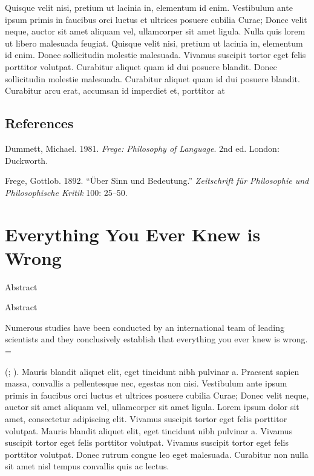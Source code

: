 \documentclass{scrbook}
\makeatletter
\def\@comingchapterauthor{} %
\def\@chapterauthor{} %
\newcommand{\chapterauthor}[1]{\def\@comingchapterauthor{#1}}
\newenvironment{abstract}{%
  \if@titlepage
    \titlepage
    \null\vfil
    \@beginparpenalty\@lowpenalty
    \if@abstrt
      \begin{center}
        \normalfont\sectfont\nobreak\abstractname
        \@endparpenalty\@M
      \end{center}
    \fi
  \else
    \if@twocolumn\if@abstrt
        \addsec*{\abstractname}
      \fi
    \else
      \if@abstrt
        \small
        \begin{center}
          {\normalfont\sectfont\nobreak\abstractname
            \vspace{-.5em}\vspace{\z@}}%
        \end{center}
      \fi
      \quotation
    \fi
  \fi
}{%
  \if@titlepage
    \par\vfil\null\endtitlepage
  \else
    \if@twocolumn\else\endquotation\fi
  \fi
}
\newcommand*\abstractname{Abstract}
\let\oldchapter\chapter
\renewcommand{\chapter}[2][]{%
   \clearpage%
   \let\@chapterauthor\@comingchapterauthor%
   \oldchapter[#1]{#2}%
}
\newlength{\cslhangindent}
\newlength{\cslentryspacingunit} %
\newenvironment{CSLReferences}[2] %
 {%
  \setlength{\parindent}{0pt}
  \ifodd #1
  \let\oldpar\par
  \def\par{\hangindent=\cslhangindent\oldpar}
  \fi
  \setlength{\parskip}{#2\cslentryspacingunit}
 }%
 {}
\makeatother
\begin{document}
Quisque velit nisi, pretium ut lacinia in, elementum id enim. Vestibulum
ante ipsum primis in faucibus orci luctus et ultrices posuere cubilia
Curae; Donec velit neque, auctor sit amet aliquam vel, ullamcorper sit
amet ligula. Nulla quis lorem ut libero malesuada feugiat. Quisque velit
nisi, pretium ut lacinia in, elementum id enim. Donec sollicitudin
molestie malesuada. Vivamus suscipit tortor eget felis porttitor
volutpat. Curabitur aliquet quam id dui posuere blandit. Donec
sollicitudin molestie malesuada. Curabitur aliquet quam id dui posuere
blandit. Curabitur arcu erat, accumsan id imperdiet et, porttitor at

\section*{References}\label{c2-c2-references}

\label{c2-refs}
\begin{CSLReferences}{1}{0}
Dummett, Michael. 1981. \emph{Frege: Philosophy of Language}. 2nd ed.
{London}: {Duckworth}.

Frege, Gottlob. 1892. {``Über Sinn und Bedeutung.''} \emph{Zeitschrift
für Philosophie und Philosophische Kritik} 100: 25--50.

\end{CSLReferences}

\chapterauthor{Al Coholic and Seymour Butt}
\chapter[Everything is Wrong]{Everything You Ever Knew is Wrong}


\begin{abstract}
Numerous studies have been conducted by an international team of leading
scientists and they conclusively establish that everything you ever knew
is wrong.
\end{abstract}
%
%
(;
). Mauris blandit
aliquet elit, eget tincidunt nibh pulvinar a. Praesent sapien massa,
convallis a pellentesque nec, egestas non nisi. Vestibulum ante ipsum
primis in faucibus orci luctus et ultrices posuere cubilia Curae; Donec
velit neque, auctor sit amet aliquam vel, ullamcorper sit amet ligula.
Lorem ipsum dolor sit amet, consectetur adipiscing elit. Vivamus
suscipit tortor eget felis porttitor volutpat. Mauris blandit aliquet
elit, eget tincidunt nibh pulvinar a. Vivamus suscipit tortor eget felis
porttitor volutpat. Vivamus suscipit tortor eget felis porttitor
volutpat. Donec rutrum congue leo eget malesuada. Curabitur non nulla
sit amet nisl tempus convallis quis ac lectus.
\end{document}
